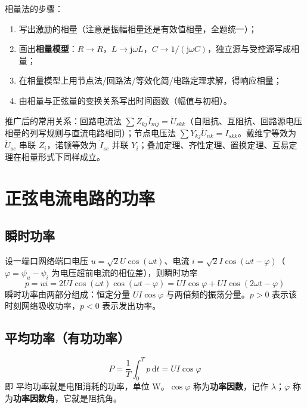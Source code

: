 相量法的步骤：
\begin{enumerate}
  \item 写出激励的相量（注意是振幅相量还是有效值相量，全题统一）；
  \item 画出\textbf{相量模型}：$R\to R$，$L\to\mathrm{j}\omega L$，$C\to1/(\mathrm{j}\omega C)$，独立源与受控源写成相量；
  \item 在相量模型上用节点法/回路法/等效化简/电路定理求解，得响应相量；
  \item 由相量与正弦量的变换关系写出时间函数（幅值与初相）。
\end{enumerate}

推广后的常用关系：回路电流法 $\sum Z_{kj}\dot{I}_{mj}=\dot{U}_{skk}$（自阻抗、互阻抗、回路源电压相量的列写规则与直流电路相同）；节点电压法 $\sum Y_{kj}\dot{U}_{nk}=\dot{I}_{skk}$。戴维宁等效为 $\dot{U}_{oc}$ 串联 $Z_i$，诺顿等效为 $\dot{I}_{sc}$ 并联 $Y_i$；叠加定理、齐性定理、置换定理、互易定理在相量形式下同样成立。


\section{正弦电流电路的功率}
\subsection{瞬时功率}
设一端口网络端口电压 $u=\sqrt{2}U\cos(\omega t)$、电流 $i=\sqrt{2}I\cos(\omega t-\varphi)$（$\varphi=\psi_u-\psi_i$ 为电压超前电流的相位差），则瞬时功率
\begin{equation}
p=ui=2UI\cos(\omega t)\cos(\omega t-\varphi)
=UI\cos\varphi+UI\cos\left(2\omega t-\varphi\right)
\end{equation}
瞬时功率由两部分组成：恒定分量 $UI\cos\varphi$ 与两倍频的振荡分量。$p>0$ 表示该时刻网络吸收功率，$p<0$ 表示发出功率。

\subsection{平均功率（有功功率）}
\begin{equation}
P=\frac{1}{T}\int_0^{T}p\,\mathrm{d}t=UI\cos\varphi
\end{equation}
即
平均功率就是电阻消耗的功率，单位 $\mathrm{W}$。$\cos\varphi$ 称为\textbf{功率因数}，记作 $\lambda$；$\varphi$ 称为\textbf{功率因数角}，它就是阻抗角。

